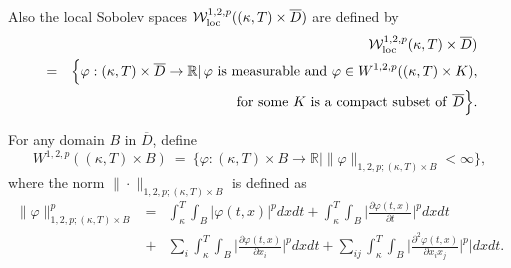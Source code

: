 \documentclass[11pt]{amsart}
\numberwithin{equation}{section}
\begin{document}
Also the local Sobolev spaces $\mathcal{W}^{1,2, p}_{\rm loc}((\kappa , T) \times \overline{D})$ 
are defined by
\begin{eqnarray*}
&&\mathcal{W}^{1,2, p}_{{\rm loc}}(\kappa, T) \times \overline{D})\\& = & 
\Big \{ \varphi : (\kappa, T) \times \overline{D} \to
\mathbb{R}| \, \varphi \ {\rm is\ measurable\ and} \ \varphi \in W^{1,2,p}( (\kappa, T) \times K),
 \\&& {\rm for\ some}\ K\ {\rm is \ a\ compact\ subset\ of }\ \overline{D} \Big \}.
\end{eqnarray*}



For any  domain $B$ in $\overline{D}$, define $$W^{1,2, p} ( (\kappa, T) \times B) \ = \ 
\Big\{ \varphi : (\kappa , T ) \times B \to \mathbb{R} \Big| \|\varphi\|_{1,2,p; (\kappa, T) \times B} < \infty
\Big \}, $$ where the norm $\| \cdot \|_{1,2,p; (\kappa, T) \times B}$ is defined as 
\interdisplaylinepenalty=0
\begin{eqnarray*}
\|\varphi\|^p_{1,2,p; (\kappa, T) \times B } & = &  \int^T_{\kappa} \int_{B} | \varphi(t, x)|^p  dx dt  + 
\int^T_{\kappa} \int_{B} \Big | \frac{\partial \varphi(t,x)}{\partial t}\Big |^p  dx dt \\
& +& \sum_i \int^T_{\kappa} \int_{B} \Big| \frac{\partial \varphi(t,x)}{\partial x_i} \Big|^p  dx  dt+ 
\sum_{ij} \int^T_{\kappa} \int_{B} \Big| \frac{\partial^2 \varphi(t,x)}{\partial x_i x_j} \Big|^p| dx dt.
\end{eqnarray*}
\end{document}

